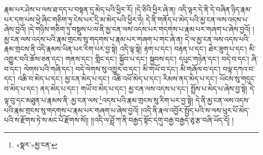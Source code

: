 རྣམ་པར་ཤེས་པ་ལས་ཐ་དད་པ་བསྟན་དུ་མེད་པའི་ཕྱིར་རོ། །དེ་ཅིའི་ཕྱིར་ཞེ་ན། འདི་ལྟར་དེ་ནི་དེ་བཞིན་ཉིད་རྣམ་པར་དག་པས་ཕྱེ་ཞིང་གཅིག་ཏུ་ངེས་པར་དྲི་མ་མེད་པའི་ཕྱིར་ཏེ། དེ་ནི་གནོད་པ་མེད་པའི་མྱ་ངན་ལས་འདས་པ་ཞེས་བྱའོ། །དེ་གཉིས་གཅིག་ཏུ་བསྡུས་པ་ལ་ནི་མྱ་ངན་ལས་འདས་པར་གདགས་པ་རྣམ་པར་གཞག་པ་ཞེས་བྱའོ། །མྱ་ངན་ལས་འདས་པའི་རྣམ་གྲངས་སུ་གདགས་པ་རྣམ་པར་གཞག་པ་གང་ཞེ་ན། དེ་ལ་མྱ་ངན་ལས་འདས་པའི་རྣམ་གྲངས་ནི་འདི་རྣམས་ཡིན་པར་རིག་པར་བྱ་སྟེ། འདི་ལྟ་སྟེ། རྟག་པ་དང་། བརྟན་པ་དང་། ཐེར་ཟུག་པ་དང་། མི་འགྱུར་བའི་ཆོས་ཅན་དང་། གནས་དང་། གླིང་དང་། སྐྱོབ་པ་དང་། སྐྱབས་དང་། དཔུང་གཉེན་དང་། བདེ་བ་དང་། ཞི་བ་དང་། ལེགས་པའི་གཞི་དང་། བདེ་ལེགས་སུ་འགྱུར་བ་དང་། མི་གཡོ་བ་དང་། མི་གཞོལ་བ་དང་། བལྟ་དཀའ་བ་དང་། འཆི་བ་མེད་པ་དང་། མྱ་ངན་མེད་པ་དང་། འཆི་འཕོ་མེད་པ་དང་། རིམས་ནད་མེད་པ་དང་། ཡོངས་སུ་གདུང་བ་མེད་པ་དང་། ནད་མེད་པ་དང་། གཡོ་བ་མེད་པ་དང་། མྱ་ངན་ལས་འདས་པ་དང་། སྤྲོས་པ་མེད་པ་ཞེས་བྱ་སྟེ། དེ་ལྟ་བུ་དང་མཐུན་པ་རྣམས་ནི་:མྱ་ངན་ལས་\footnote{«སྣར་»མྱ་ངན་}འདས་པའི་རྣམ་གྲངས་སུ་རིག་པར་བྱ་སྟེ། དེ་ནི་མྱ་ངན་ལས་འདས་པའི་རྣམ་གྲངས་སུ་གདགས་པ་རྣམ་པར་གཞག་པ་ཞེས་བྱའོ། །འདི་ནི་རྣལ་འབྱོར་སྤྱོད་པའི་ས་ལས་ཕུར་པོ་མེད་པའི་ས་རྫོགས་ཏེ་ས་མང་པོ་རྫོགས་སོ།། །།འདི་ལ་ཤློ་ཀ་ནི་བརྒྱད་སྟོང་དགུ་བརྒྱ་བརྒྱད་ཅུ་རྩ་བཞི་ཡོད་དོ། །
 